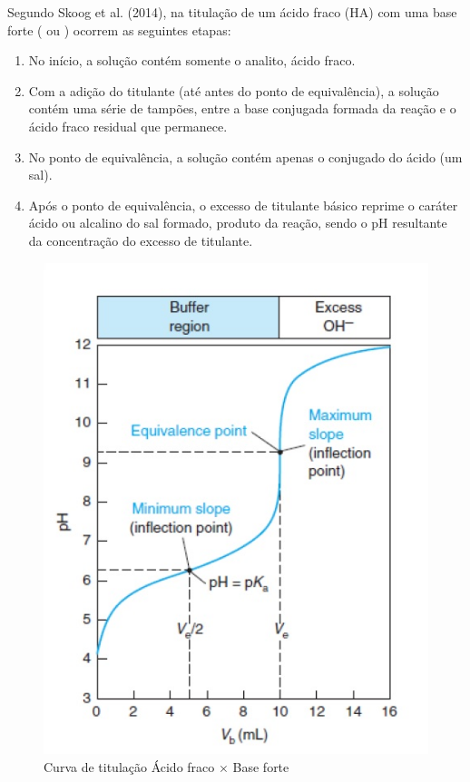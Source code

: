 \begin{center}
\end{center} 

Segundo Skoog et al. (2014), na titulação de um ácido fraco (HA) com uma base forte ( ou
) ocorrem as seguintes etapas:

\begin{enumerate}
    \item No início, a solução contém somente o analito, ácido fraco.
    \item Com a adição do titulante (até antes do ponto de equivalência), a solução contém uma série
        de tampões, entre a base conjugada formada da reação e o ácido fraco residual que permanece.
    \item No ponto de equivalência, a solução contém apenas o conjugado do ácido (um sal).
    \item Após o ponto de equivalência, o excesso de titulante básico reprime o caráter ácido ou
        alcalino do sal formado, produto da reação, sendo o pH resultante da concentração do excesso
        de titulante.
\end{enumerate}

\begin{figure}[H]
\begin{center}
    \includegraphics[scale=.9]{figuras/titulacao.jpg}
\end{center}
\caption{Curva de titulação Ácido fraco $\times$ Base forte}
\label{fig:curva_titulacao}
\end{figure}

